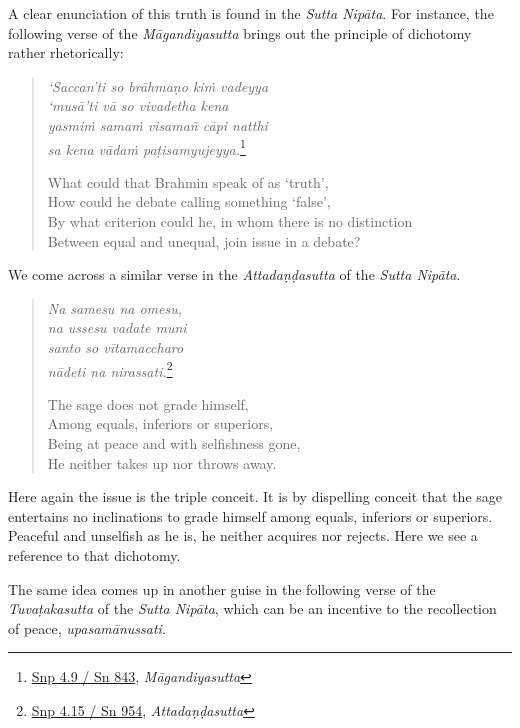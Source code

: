 A clear enunciation of this truth is found in the \emph{Sutta Nipāta}. For instance, the following verse of the \emph{Māgandiyasutta} brings out the principle of dichotomy rather rhetorically:

\begin{quote}
\emph{`Saccan'ti so brāhmaṇo kiṁ vadeyya}\\
\emph{`musā'ti vā so vivadetha kena}\\
\emph{yasmiṁ samaṁ visamañ cāpi natthi}\\
\emph{sa kena vādaṁ paṭisamyujeyya.}\footnote{\href{https://suttacentral.net/snp4.9/pli/ms}{Snp 4.9 / Sn 843}, \emph{Māgandiyasutta}}

What could that Brahmin speak of as `truth',\\
How could he debate calling something `false',\\
By what criterion could he, in whom there is no distinction\\
Between equal and unequal, join issue in a debate?
\end{quote}

We come across a similar verse in the \emph{Attadaṇḍasutta} of the \emph{Sutta Nipāta}.

\begin{quote}
\emph{Na samesu na omesu,}\\
\emph{na ussesu vadate muni}\\
\emph{santo so vītamaccharo}\\
\emph{nādeti na nirassati.}\footnote{\href{https://suttacentral.net/snp4.15/pli/ms}{Snp 4.15 / Sn 954}, \emph{Attadaṇḍasutta}}

The sage does not grade himself,\\
Among equals, inferiors or superiors,\\
Being at peace and with selfishness gone,\\
He neither takes up nor throws away.
\end{quote}

Here again the issue is the triple conceit. It is by dispelling conceit that the sage entertains no inclinations to grade himself among equals, inferiors or superiors. Peaceful and unselfish as he is, he neither acquires nor rejects. Here we see a reference to that dichotomy.

The same idea comes up in another guise in the following verse of the \emph{Tuvaṭakasutta} of the \emph{Sutta Nipāta}, which can be an incentive to the recollection of peace, \emph{upasamānussati}.

